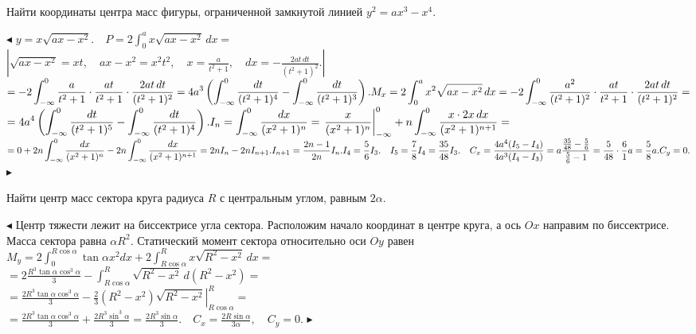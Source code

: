 \documentclass[a5paper,10pt]{article}
\begin{document}
\medskip
{} Найти координаты центра масс фигуры,
ограниченной замкнутой линией  $y^2=ax^3-x^4$.

\smallskip
\noindent $\blacktriangleleft$
$\displaystyle y=x\sqrt{ax-x^2}.\quad P=2\int_0^ax\sqrt{ax-x^2}\,dx=$\\
$\displaystyle \left| \sqrt{ax-x^2}=xt,\quad ax-x^2=x^2t^2,\quad
x=\frac{a}{t^2+1},\quad dx=-\frac{2at\,dt}{(t^2+1)^2}. \right|$\\
$\displaystyle =-2\int_{-\infty}^0\frac{a}{t^2+1}\cdot\frac{at}{t^2+1}\cdot\frac{2at\,dt}{(t^2+1)^2}=
4a^3\left(\int_{-\infty}^0\frac{dt}{(t^2+1)^4}-\int_{-\infty}^0\frac{dt}{(t^2+1)^3} \right ).\\
M_x=2\int_0^ax^2\sqrt{ax-x^2}\,dx=
-2\int_{-\infty}^0\frac{a^2}{(t^2+1)^2}\cdot\frac{at}{t^2+1}\cdot\frac{2at\,dt}{(t^2+1)^2}=$\\
$\displaystyle =4a^4\left(\int_{-\infty}^0\frac{dt}{(t^2+1)^5}-
\int_{-\infty}^0\frac{dt}{(t^2+1)^4}\right).\\
I_n=\int_{-\infty}^0\frac{dx}{(x^2+1)^{n}}=
\left.\frac{x}{(x^2+1)^{n}}\right|_{-\infty}^0+
n\int_{-\infty}^0\frac{x\cdot 2x\,dx}{(x^2+1)^{n+1}}=$\\
$\displaystyle =0+2n\int_{-\infty}^0\frac{dx}{(x^2+1)^{n}}-
2n\int_{-\infty}^0\frac{dx}{(x^2+1)^{n+1}}=2nI_n-2nI_{n+1}.\\
I_{n+1}=\frac{2n-1}{2n}I_n.\\
I_4=\frac56I_3.\quad I_5=\frac78I_4=\frac{35}{48}I_3.\quad
C_x=\frac{4a^4(I_5-I_4)}{4a^3(I_4-I_3)}=
a\frac{\frac{35}{48}-\frac56}{\frac56-1}=\frac{5}{48}\cdot\frac61a=\frac58a.\\
C_y=0.$
$\blacktriangleright$

\medskip
{} Найти центр масс сектора круга радиуса $R$
с центральным углом, равным $2\alpha$.

\smallskip
\noindent $\blacktriangleleft$ Центр тяжести лежит на биссектрисе
угла сектора. Расположим начало координат в центре круга, а ось $Ox$
направим по биссектрисе. Масса сектора равна $\alpha R^2$.
Статический момент сектора относительно оси $Oy$ равен\\
$\displaystyle M_y=2\int_0^{R\cos\alpha}\tan\alpha x^2dx+
2\int_{R\cos\alpha}^Rx\sqrt{R^2-x^2}\,dx=$\\
$\displaystyle =2\frac{R^3\tan\alpha \cos^3\alpha}{3}-
\int_{R\cos\alpha}^R\sqrt{R^2-x^2}\,d(R^2-x^2)=$\\
$\displaystyle =\frac{2R^3\tan\alpha \cos^3\alpha}{3}-
\frac23\left.(R^2-x^2)\sqrt{R^2-x^2}\right|_{R\cos\alpha}^R=$\\
$\displaystyle =\frac{2R^3\tan\alpha \cos^3\alpha}{3}+
\frac{2R^3\sin^3\alpha}{3}=\frac{2R^3\sin\alpha}{3}.\quad
C_x=\frac{2R\sin\alpha}{3\alpha},\quad C_y=0$.
$\blacktriangleright$
\end{document}
